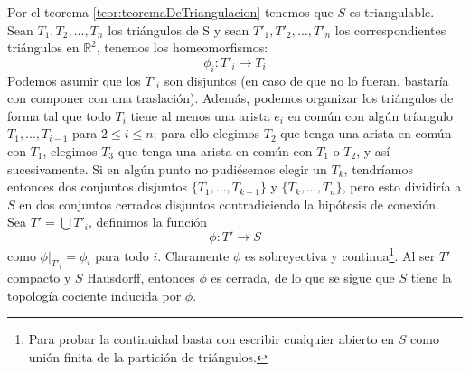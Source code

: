 \documentclass[a4paper,11pt,spanish, twoside, leqno]{tfg-uam}
\newcommand*{\reales}{\mathbb{R}}
\theoremstyle{definition}
\begin{document}
Por el teorema \ref{teor:teoremaDeTriangulacion} tenemos que $S$ es triangulable. Sean $T_1, T_2, ..., T_n$ los triángulos de S y sean $T'_1, T'_2, ...,  T'_n$ los correspondientes triángulos en $\reales^2$, tenemos los homeomorfismos:
\[
\phi_i: T'_i \longrightarrow T_i
\]
Podemos asumir que los $T'_i$ son disjuntos (en caso de que no lo fueran, bastaría con componer con una traslación). Además, podemos organizar los triángulos de forma tal que todo $T_i$ tiene al menos una arista $e_i$ en común con algún tríangulo $T_1, ..., T_{i-1}$ para $2\leq i \leq n$; para ello elegimos $T_2$ que tenga una arista en común con $T_1$, elegimos $T_3$ que tenga una arista en común con $T_1$ o $T_2$, y así sucesivamente. Si en algún punto no pudiésemos elegir un $T_k$, tendríamos entonces dos conjuntos disjuntos $\{T_1, ..., T_{k-1} \}$ y $\{T_k, ..., T_n\}$, pero esto dividiría a $S$ en dos conjuntos cerrados disjuntos contradiciendo la hipótesis de conexión.\\
Sea $T' = \bigcup T'_i$, definimos la función 
\[
\phi: T' \longrightarrow S
\]
como $\phi |_{T'_i} = \phi_i$ para todo $i$. Claramente $\phi$ es sobreyectiva y continua\footnote{Para probar la continuidad basta con escribir cualquier abierto en $S$ como unión finita de la partición de triángulos.}. Al ser $T'$ compacto y $S$ Hausdorff, entonces $\phi$ es cerrada, de lo que se sigue que $S$ tiene la topología cociente inducida por $\phi$.
\end{document}
